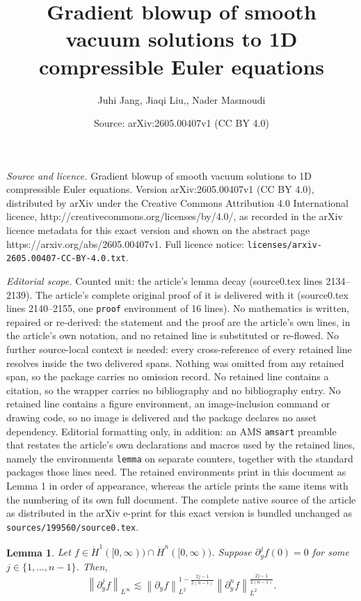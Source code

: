 \documentclass[10pt,a4paper]{amsart}
\title{Gradient blowup of smooth vacuum solutions to 1D compressible Euler equations}
\author{Juhi Jang, Jiaqi Liu,, Nader Masmoudi}
\date{Source: arXiv:2605.00407v1 (CC BY 4.0)}
\newtheorem{lemma}{Lemma}
\def\be{\begin{equation}}
\def\ee{\end{equation}}
\newcommand{\norm}[1]{\left\lVert#1\right\rVert}
\newcommand{\pa}{\partial}
\begin{document}
\maketitle

\noindent\emph{Source and licence.} Gradient blowup of smooth vacuum solutions to 1D compressible Euler equations. Version arXiv:2605.00407v1 (CC BY 4.0), distributed by arXiv under the Creative Commons Attribution 4.0 International licence, http://creativecommons.org/licenses/by/4.0/, as recorded in the arXiv licence metadata for this exact version and shown on the abstract page https://arxiv.org/abs/2605.00407v1. Full licence notice: \texttt{licenses/arxiv-2605.00407-CC-BY-4.0.txt}.\par\smallskip

\noindent\textit{Editorial scope.} Counted unit: the article's lemma decay (source0.tex lines 2134--2139). The article's complete original proof of it is delivered with it (source0.tex lines 2140--2155, one \texttt{proof} environment of 16 lines). No mathematics is written, repaired or re-derived: the statement and the proof are the article's own lines, in the article's own notation, and no retained line is substituted or re-flowed.  No further source-local context is needed: every cross-reference of every retained line resolves inside the two delivered spans.  Nothing was omitted from any retained span, so the package carries no omission record.  No retained line contains a citation, so the wrapper carries no bibliography and no bibliography entry.  No retained line contains a figure environment, an image-inclusion command or drawing code, so no image is delivered and the package declares no asset dependency.  Editorial formatting only, in addition: an AMS \texttt{amsart} preamble that restates the article's own declarations and macros used by the retained lines, namely the environments \texttt{lemma} on separate counters, together with the standard packages those lines need.  The retained environments print in this document as Lemma 1 in order of appearance, whereas the article prints the same items with the numbering of its own full document.  The complete native source of the article as distributed in the arXiv e-print for this exact version is bundled unchanged as \texttt{sources/199560/source0.tex}.
\begin{lemma}\label{Linfty decay}
	Let $f \in\dot H^1([0,\infty)) \cap \dot H^n([0,\infty))$. Suppose $\pa_y ^j f(0) =0$ for some $j\in\{1,\dots, n-1\}$. Then, 
	\be
		\norm{\pa_y^j f}_{L^\infty} \lesssim \norm{\pa_y f}_{L^2}^{1-\frac{2j-1}{2(n-1)}} \norm{\pa_y^n f}_{L^2}^{\frac{2j-1}{2(n-1)}}. 
	\ee
\end{lemma}
\end{document}
